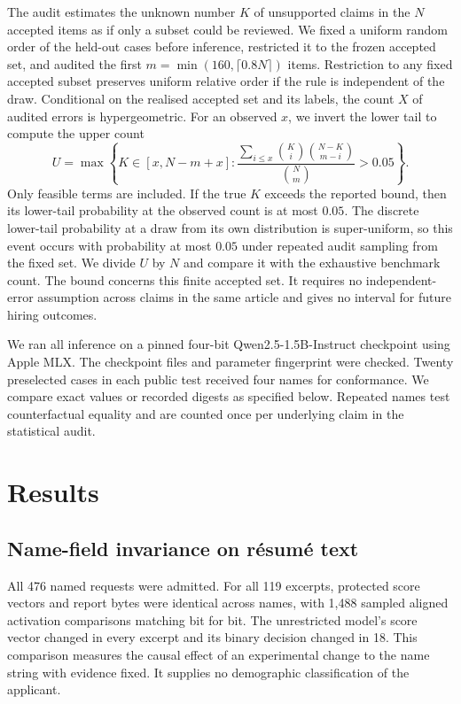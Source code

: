 \documentclass[11pt,a4paper]{article}
\begin{document}
The audit estimates the unknown number \(K\) of unsupported claims in the \(N\) accepted items as if only a subset could be reviewed. We fixed a uniform random order of the held-out cases before inference, restricted it to the frozen accepted set, and audited the first \(m=\min(160,\lceil 0.8N\rceil)\) items. Restriction to any fixed accepted subset preserves uniform relative order if the rule is independent of the draw. Conditional on the realised accepted set and its labels, the count \(X\) of audited errors is hypergeometric. For an observed \(x\), we invert the lower tail to compute the upper count
\begin{equation}
 U=\max\left\{K\in[x,N-m+x] :
 \frac{\displaystyle\sum_{i\le x}\binom{K}{i}\binom{N-K}{m-i}}
 {\binom{N}{m}}>0.05\right\}.
 \label{eq:audit}
\end{equation}
Only feasible terms are included. If the true \(K\) exceeds the reported bound, then its lower-tail probability at the observed count is at most \(0.05\). The discrete lower-tail probability at a draw from its own distribution is super-uniform, so this event occurs with probability at most \(0.05\) under repeated audit sampling from the fixed set. We divide \(U\) by \(N\) and compare it with the exhaustive benchmark count. The bound concerns this finite accepted set. It requires no independent-error assumption across claims in the same article and gives no interval for future hiring outcomes.

We ran all inference on a pinned four-bit Qwen2.5-1.5B-Instruct checkpoint using Apple MLX. The checkpoint files and parameter fingerprint were checked. Twenty preselected cases in each public test received four names for conformance. We compare exact values or recorded digests as specified below. Repeated names test counterfactual equality and are counted once per underlying claim in the statistical audit.

\section{Results}
\subsection{Name-field invariance on résumé text}

All 476 named requests were admitted. For all 119 excerpts, protected score vectors and report bytes were identical across names, with 1,488 sampled aligned activation comparisons matching bit for bit. The unrestricted model's score vector changed in every excerpt and its binary decision changed in 18. This comparison measures the causal effect of an experimental change to the name string with evidence fixed. It supplies no demographic classification of the applicant.
\end{document}
